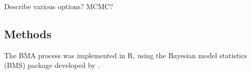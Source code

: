 \documentclass[12pt]{article}
\begin{document}
Describe various options? MCMC? 


\subsection{Methods}

The BMA process was implemented in R, using the Bayesian model statistics (BMS) package developed by \cite{Zeugner2015}. 

















	
\pagebreak


\end{document}
